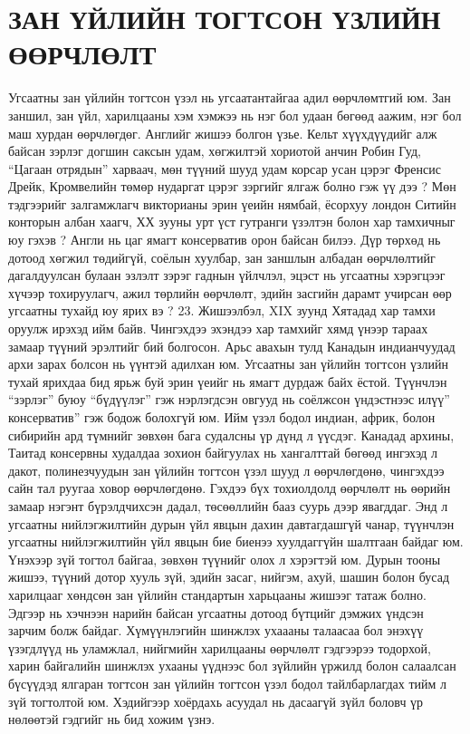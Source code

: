 \section{ЗАН ҮЙЛИЙН ТОГТСОН ҮЗЛИЙН ӨӨРЧЛӨЛТ}
Угсаатны зан үйлийн тогтсон үзэл нь угсаатантайгаа адил өөрчлөмтгий юм. Зан заншил, зан үйл, харилцааны хэм хэмжээ нь нэг бол удаан бөгөөд аажим, нэг бол маш хурдан өөрчлөгдөг. Английг жишээ болгон үзье. Кельт хүүхдүүдийг алж байсан зэрлэг догшин саксын удам, хөгжилтэй хориотой анчин Робин Гуд, “Цагаан отрядын” харваач, мөн түүний шууд удам корсар усан цэрэг Френсис Дрейк, Кромвелийн төмөр нударгат цэрэг зэргийг ялгаж болно гэж үү дээ ? Мөн тэдгээрийг залгамжлагч викторианы эрин үеийн нямбай, ёсорхуу лондон Ситийн конторын албан хаагч, ХХ зууны урт үст гутранги үзэлтэн болон хар тамхичныг юу гэхэв ? Англи нь цаг ямагт консерватив орон байсан билээ. Дүр төрхөд нь дотоод хөгжил төдийгүй, соёлын хуулбар, зан заншлын албадан өөрчлөлтийг дагалдуулсан булаан эзлэлт зэрэг гаднын үйлчлэл, эцэст нь угсаатны хэрэгцээг хүчээр тохируулагч, ажил төрлийн өөрчлөлт, эдийн засгийн дарамт учирсан өөр угсаатны тухайд юу ярих вэ ? 23. Жишээлбэл, XIX зуунд Хятадад хар тамхи оруулж ирэхэд ийм байв. Чингэхдээ эхэндээ хар тамхийг хямд үнээр тараах замаар түүний эрэлтийг бий болгосон. Арьс авахын тулд Канадын индианчуудад архи зарах болсон нь үүнтэй адилхан юм.
Угсаатны зан үйлийн тогтсон үзлийн тухай ярихдаа бид ярьж буй эрин үеийг нь ямагт дурдаж байх ёстой. Түүнчлэн “зэрлэг” буюу “бүдүүлэг” гэж нэрлэгдсэн овгууд нь соёлжсон үндэстнээс илүү” консерватив” гэж бодож болохгүй юм. Ийм үзэл бодол индиан, африк, болон сибирийн ард түмнийг зөвхөн бага судалсны үр дүнд л үүсдэг. Канадад архины, Таитад консервны худалдаа зохион байгуулах нь хангалттай бөгөөд ингэхэд л дакот, полинезчуудын зан үйлийн тогтсон үзэл шууд л өөрчлөгдөнө, чингэхдээ сайн тал руугаа ховор өөрчлөгдөнө. Гэхдээ бүх тохиолдолд өөрчлөлт нь өөрийн замаар нэгэнт бүрэлдчихсэн дадал, төсөөллийн бааз суурь дээр явагддаг. Энд л угсаатны нийлэгжилтийн дурын үйл явцын дахин давтагдашгүй чанар, түүнчлэн угсаатны нийлэгжилтийн үйл явцын бие биенээ хуулдаггүйн шалтгаан байдаг юм. Үнэхээр зүй тогтол байгаа, зөвхөн түүнийг олох л хэрэгтэй юм.
Дурын тооны жишээ, түүний дотор хууль зүй, эдийн засаг, нийгэм, ахуй, шашин болон бусад харилцааг хөндсөн зан үйлийн стандартын харьцааны жишээг татаж болно. Эдгээр нь хэчнээн нарийн байсан угсаатны дотоод бүтцийг дэмжих үндсэн зарчим болж байдаг. Хүмүүнлэгийн шинжлэх ухаааны талаасаа бол энэхүү үзэгдлүүд нь уламжлал, нийгмийн харилцааны өөрчлөлт гэдгээрээ тодорхой, харин байгалийн шинжлэх ухааны үүднээс бол зүйлийн үржилд болон салаалсан бүсүүдэд ялгаран тогтсон зан үйлийн тогтсон үзэл бодол тайлбарлагдах тийм л зүй тогтолтой юм. Хэдийгээр хоёрдахь асуудал нь дасаагүй зүйл боловч үр нөлөөтэй гэдгийг нь бид хожим үзнэ.
